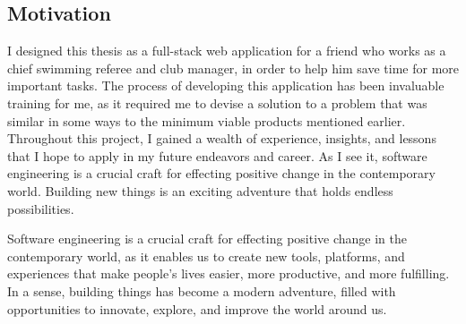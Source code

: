 \subsection*{Motivation}
\par
I designed this thesis as a full-stack web application for a friend who works as a chief swimming referee and club manager, in order to help him save time for more important tasks. The process of developing this application has been invaluable training for me, as it required me to devise a solution to a problem that was similar in some ways to the minimum viable products mentioned earlier. Throughout this project, I gained a wealth of experience, insights, and lessons that I hope to apply in my future endeavors and career. As I see it, software engineering is a crucial craft for effecting positive change in the contemporary world. Building new things is an exciting adventure that holds endless possibilities.
\par
Software engineering is a crucial craft for effecting positive change in the contemporary world, as it enables us to create new tools, platforms, and experiences that make people's lives easier, more productive, and more fulfilling. In a sense, building things has become a modern adventure, filled with opportunities to innovate, explore, and improve the world around us.